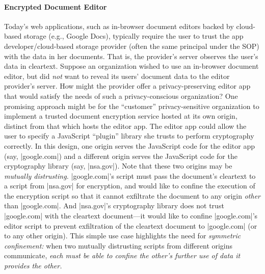 \paragraph{Encrypted Document Editor}
Today's web applications, such as in-browser document editors backed
by cloud-based storage (e.g., Google Docs), typically require the user
to trust the app developer/cloud-based storage provider (often the
same principal under the SOP) with the data in her documents. That is,
the provider's server observes the user's data in cleartext. Suppose
an organization wished to use an in-browser document editor, but did
{\em not} want to reveal its users' document data to the editor
provider's server. How might the provider offer a privacy-preserving
editor app that would satisfy the needs of such a privacy-conscious
organization?  One promising approach might be for the ``customer''
privacy-sensitive organization to implement a trusted document encryption
service hosted at its own origin, distinct from that which hosts the
editor app. The editor app could allow the user to specify a JavaScript
``plugin'' library she trusts to perform cryptography correctly. In this design,
one origin serves the JavaScript code for the editor app (say,
\js|google.com|) and a different origin serves the JavaScript code for
the cryptography library (say, \js|nsa.gov|). Note that these two
origins may be {\em mutually distrusting.}  \js|google.com|'s script
must pass the document's cleartext to a script from \js|nsa.gov| for
encryption, and would like to confine the execution of the encryption
script so that it cannot exfiltrate the document to any origin {\em
  other} than \js|google.com|. 
And \js|nsa.gov|'s cryptography library
does not trust \js|google.com| with the cleartext document---it would
like to confine \js|google.com|'s editor script to prevent
exfiltration of the cleartext document to \js|google.com| (or to any
other origin). This simple use case highlights the need for {\em
  symmetric confinement:} when two mutually distrusting scripts from
different origins communicate, {\em each must be able to confine the
  other's further use of data it provides the other.}

